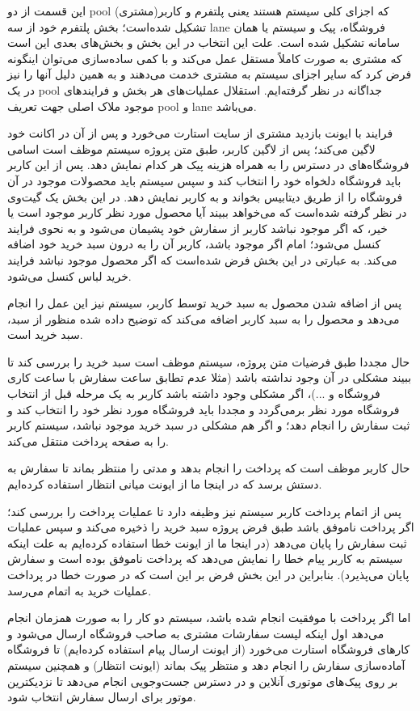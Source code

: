 \documentclass[]{article}
\begin{document}
این قسمت از دو pool که اجزای کلی سیستم هستند یعنی پلتفرم و کاربر(مشتری)
تشکیل شده‌است؛ بخش پلتفرم خود از سه lane فروشگاه، پیک و سیستم یا همان
سامانه تشکیل شده است. علت این انتخاب در این بخش و بخش‌های بعدی این است
که مشتری به صورت کاملاً مستقل عمل می‌کند و با کمی ساده‌سازی می‌توان
اینگونه فرض کرد که سایر اجزای سیستم به مشتری خدمت می‌دهند و به همین دلیل
آنها را نیز در یک pool جداگانه در نظر گرفته‌ایم. استقلال عملیات‌های هر
بخش و فرایندهای موجود ملاک اصلی جهت تعریف pool و lane می‌باشد.

فرایند با ایونت بازدید مشتری از سایت استارت می‌خورد و پس از آن در اکانت
خود لاگین می‌کند؛ پس از لاگین کاربر، طبق متن پروژه سیستم موظف است اسامی
فروشگاه‌های در دسترس را به همراه هزینه پیک هر کدام نمایش دهد. پس از این
کاربر باید فروشگاه دلخواه خود را انتخاب کند و سپس سیستم باید محصولات
موجود در آن فروشگاه را از طریق دیتابیس بخواند و به کاربر نمایش دهد. در
این بخش یک گیت‌وی در نظر گرفته شده‌است که می‌خواهد ببیند آیا محصول مورد
نظر کاربر موجود است یا خیر، که اگر موجود نباشد کاربر از سفارش خود پشیمان
می‌شود و به نحوی فرایند کنسل می‌شود؛ امام اگر موجود باشد، کاربر آن را به
درون سبد خرید خود اضافه می‌کند. به عبارتی در این بخش فرض شده‌است که اگر
محصول موجود نباشد فرایند خرید لباس کنسل می‌شود.

پس از اضافه شدن محصول به سبد خرید توسط کاربر، سیستم نیز این عمل را انجام
می‌دهد و محصول را به سبد کاربر اضافه می‌کند که توضیح داده شده منظور از
سبد، سبد خرید است.

حال مجددا طبق فرضیات متن پروژه، سیستم موظف است سبد خرید را بررسی کند تا
ببیند مشکلی در آن وجود نداشته باشد (مثلا عدم تطابق ساعت سفارش با ساعت
کاری فروشگاه و ...)، اگر مشکلی وجود داشته باشد کاربر به یک مرحله قبل از
انتخاب فروشگاه مورد نظر برمی‌گردد و مجددا باید فروشگاه مورد نظر خود را
انتخاب کند و ثبت سفارش را انجام دهد؛ و اگر هم مشکلی در سبد خرید موجود
نباشد، سیستم کاربر را به صفحه پرداخت منتقل می‌کند.

حال کاربر موظف است که پرداخت را انجام بدهد و مدتی را منتظر بماند تا
سفارش به دستش برسد که در اینجا ما از ایونت میانی انتظار استفاده
کرده‌ایم.

پس از اتمام پرداخت کاربر سیستم نیز وظیفه دارد تا عملیات پرداخت را بررسی
کند؛ اگر پرداخت ناموفق باشد طبق فرض پروژه سبد خرید را ذخیره می‌کند و سپس
عملیات ثبت سفارش را پایان می‌دهد (در اینجا ما از ایونت خطا استفاده
کرده‌ایم به علت اینکه سیستم به کاربر پیام خطا را نمایش می‌دهد که پرداخت
ناموفق بوده است و سفارش پایان می‌پذیرد). بنابراین در این بخش فرض بر این
است که در صورت خطا در پرداخت عملیات خرید به اتمام می‌رسد.

اما اگر پرداخت با موفقیت انجام شده باشد، سیستم دو کار را به صورت همزمان
انجام می‌دهد اول اینکه لیست سفارشات مشتری به صاحب فروشگاه ارسال می‌شود و
کارهای فروشگاه استارت می‌خورد (از ایونت ارسال پیام استفاده کرده‌ایم) تا
فروشگاه آماده‌سازی سفارش را انجام دهد و منتظر پیک بماند (ایونت انتظار) و
همچنین سیستم بر روی پیک‌های موتوری آنلاین و در دسترس جست‌وجویی انجام
می‌دهد تا نزدیکترین موتور برای ارسال سفارش انتخاب شود.
\end{document}
